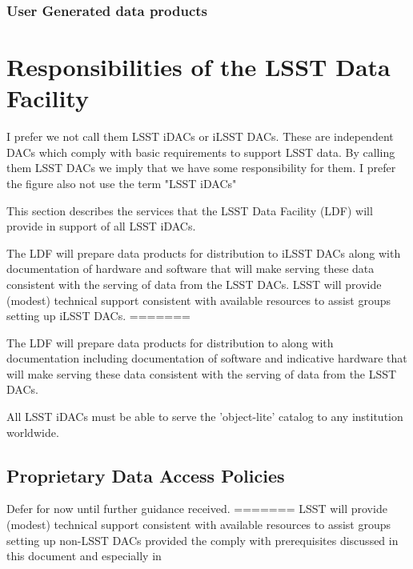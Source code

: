 \subsubsection{User Generated data products }

\section{Responsibilities of the LSST Data Facility}

{\color{red} I prefer we not call them LSST iDACs or iLSST DACs. These are independent DACs which comply with basic requirements to support LSST data. By calling them LSST DACs we imply that we have some responsibility for them. I prefer the figure also not use the term "LSST iDACs"}

This section describes the services that the LSST Data Facility (LDF) will provide in support of all LSST iDACs.

The LDF will prepare data products for distribution to iLSST DACs along with documentation of hardware and software that will make serving these data consistent with the serving of data from the LSST DACs. LSST will provide (modest) technical support consistent with available resources to assist groups setting up iLSST DACs. 
=======

The LDF will prepare data products for distribution to along with documentation  including documentation of  software  and indicative hardware that will make serving these data consistent with the serving of data from the LSST DACs.

All LSST  iDACs must be able to serve the 'object-lite' catalog to any institution worldwide.

\subsection{Proprietary Data Access Policies}
{\color{red}Defer for now until further guidance received.} \newline
=======
LSST will provide (modest) technical support consistent with available resources to assist groups setting up non-LSST DACs provided the comply with prerequisites discussed in this document and especially in 

